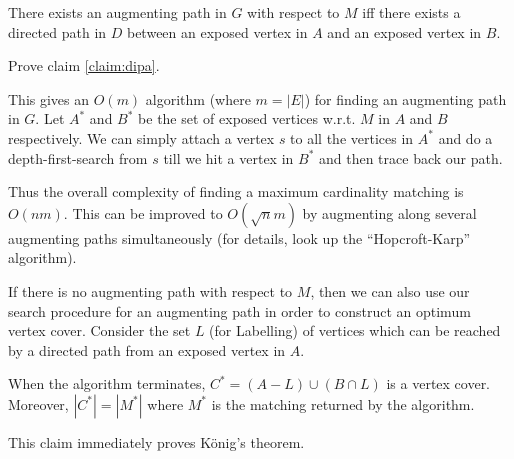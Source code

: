 \documentclass[12pt]{article}
\begin{document}
\begin{claim} \label{claim:dipa}
There exists an augmenting path in $G$ with respect to $M$ iff there
exists a directed path in $D$ between an exposed vertex in $A$ and an
exposed vertex in $B$.
\end{claim}

\begin{exercises}
\item
Prove claim \ref{claim:dipa}.
\end{exercises}

This gives an $O(m)$ algorithm (where $m=|E|$) for finding an
augmenting path in $G$.  Let $A^{*}$ and $B^{*}$ be the set of exposed
vertices w.r.t. $M$ in $A$ and $B$ respectively.  We can simply attach
a vertex $s$ to all the vertices in $A^{*}$ and do a
depth-first-search from $s$ till we hit a vertex in $B^{*}$ and then
trace back our path.  


Thus the overall complexity of finding a maximum
cardinality matching is $O(nm)$.  This can be improved to
$O(\sqrt{n}m)$ by augmenting along several augmenting paths
simultaneously (for details, look up the ``Hopcroft-Karp'' algorithm).

If there is no augmenting path with respect to $M$, then we can also
use our search procedure for an augmenting path in order to construct
an optimum vertex cover. Consider the set $L$ (for Labelling) of
vertices which can be reached by a directed path from an exposed
vertex in $A$.

\begin{claim}
When the algorithm terminates, $C^*=(A-L)\cup (B\cap L)$ is a vertex
cover. Moreover, $|C^*|=|M^*|$ where $M^*$ is the matching returned by
the algorithm.
\end{claim}
This claim immediately proves K\"onig's theorem.
\end{document}
